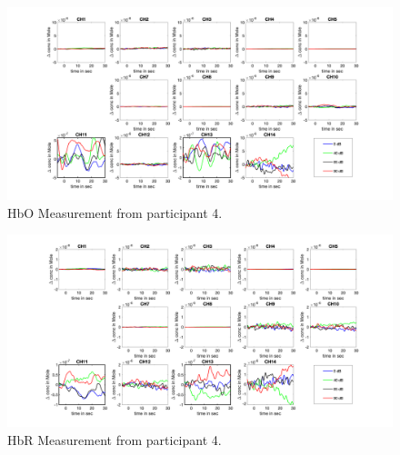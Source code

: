 \begin{figure}[H]
  \centering
    \includegraphics[scale=.35]{bilder/HbO_Mole/sub_lin_s_HbO.png}
  \caption{HbO Measurement from participant 4.}
  \label{fig:somesignal}
\end{figure}


\begin{figure}[H]
  \centering
    \includegraphics[scale=.35]{bilder/HbR_Mole/sub_lin_s_HbR.png}
  \caption{HbR Measurement from participant 4.}
  \label{fig:somesignal}
\end{figure}

